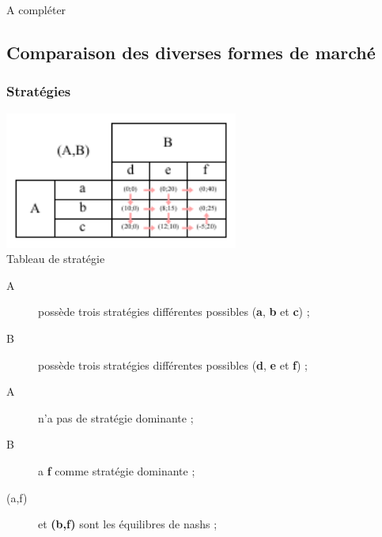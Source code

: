A compléter


\subsection{Comparaison des diverses formes de marché}



\subsubsection{Stratégies}


\begin{center}
	\includegraphics[height=4.5cm]{images/strategie.pdf}\\
	Tableau de stratégie
\end{center}
\begin{description}
	\item [A] possède trois stratégies différentes possibles (\textbf{a}, \textbf{b} et \textbf{c}) ;
	\item [B] possède trois stratégies différentes possibles (\textbf{d}, \textbf{e} et \textbf{f}) ;
	\item [A] n'a pas de stratégie dominante ;
	\item [B] a \textbf{f} comme stratégie dominante ;
	\item [(a,f)] et \textbf{(b,f)} sont les équilibres de nashs ;
\end{description}